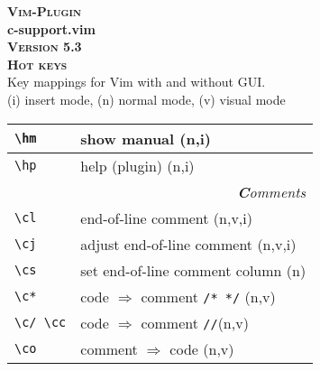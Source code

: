 \documentclass[oneside,10pt,a4paper,DIV24]{scrartcl}
\newcommand{\Pluginversion}{5.3}
\begin{document}
%
\twocolumn
%
\begin{center}
\textbf{\textsc{\small{Vim-Plugin}}}\\
\textbf{\LARGE{c-support.vim}}\\
\textbf{\textsc{\small{Version \Pluginversion}}}\\
\textbf{\textsc{\Huge{Hot keys}}}\\ 
Key mappings for Vim with and without GUI.\\
{\normalsize (i)} insert mode, {\normalsize (n)} normal mode, {\normalsize (v)} visual mode\\
%
\begin{tabular}[]{|p{14mm}|p{58mm}|}
\hline \verb'\hm'   & show manual   \hfill (n,i)\\
\hline \verb'\hp'   & help (plugin) \hfill (n,i)\\
\hline 
\hline
\multicolumn{2}{|r|}{\textsl{\textbf{C}omments}} \\
\hline \verb'\cl' & end-of-line comment                     \hfill (n,v,i)\\
\hline \verb'\cj' & adjust end-of-line comment              \hfill (n,v,i)\\
\hline \verb'\cs' & set end-of-line comment column          \hfill (n)    \\
\hline \verb'\c*' & code $\Rightarrow$ comment \verb'/* */' \hfill (n,v)  \\
\hline \verb'\c/ \cc' & code $\Rightarrow$ comment \verb'//'\hfill (n,v)  \\
\hline \verb'\co' & comment $\Rightarrow$ code              \hfill (n,v)  \\


\end{tabular}
\end{center}
\end{document}
